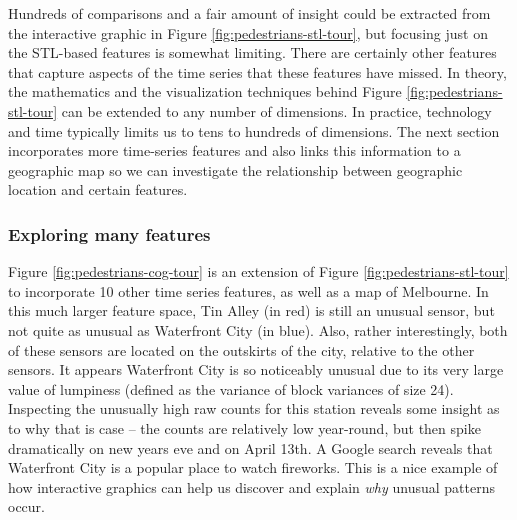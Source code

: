 \documentclass[12pt,]{article}
\theoremstyle{definition}
\theoremstyle{definition}
\theoremstyle{remark}
\begin{document}
Hundreds of comparisons and a fair amount of insight could be extracted
from the interactive graphic in Figure \ref{fig:pedestrians-stl-tour},
but focusing just on the STL-based features is somewhat limiting. There
are certainly other features that capture aspects of the time series
that these features have missed. In theory, the mathematics and the
visualization techniques behind Figure \ref{fig:pedestrians-stl-tour}
can be extended to any number of dimensions. In practice, technology and
time typically limits us to tens to hundreds of dimensions. The next
section incorporates more time-series features and also links this
information to a geographic map so we can investigate the relationship
between geographic location and certain features.

\subsubsection{Exploring many features}\label{exploring-many-features}

Figure \ref{fig:pedestrians-cog-tour} is an extension of Figure
\ref{fig:pedestrians-stl-tour} to incorporate 10 other time series
features, as well as a map of Melbourne. In this much larger feature
space, Tin Alley (in red) is still an unusual sensor, but not quite as
unusual as Waterfront City (in blue). Also, rather interestingly, both
of these sensors are located on the outskirts of the city, relative to
the other sensors. It appears Waterfront City is so noticeably unusual
due to its very large value of lumpiness (defined as the variance of
block variances of size 24). Inspecting the unusually high raw counts
for this station reveals some insight as to why that is case -- the
counts are relatively low year-round, but then spike dramatically on new
years eve and on April 13th. A Google search reveals that Waterfront
City is a popular place to watch fireworks. This is a nice example of
how interactive graphics can help us discover and explain \emph{why}
unusual patterns occur.
\end{document}
